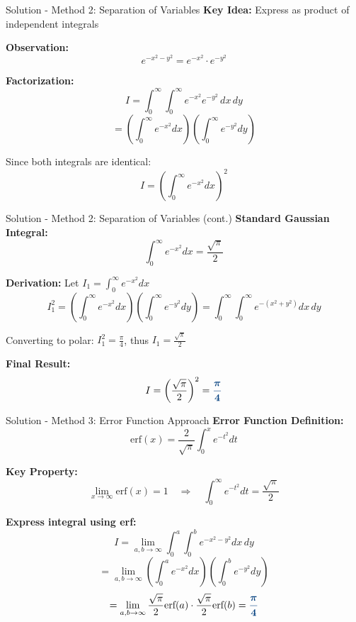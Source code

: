 \documentclass[12pt, aspectratio=169]{beamer}
\newcommand{\res}[1]{\textcolor{madblue}{\bm{#1}}}
\begin{document}
\begin{frame}{Solution - Method 2: Separation of Variables}
\textbf{Key Idea:} Express as product of independent integrals

\textbf{Observation:}
\[
e^{-x^2 - y^2} = e^{-x^2} \cdot e^{-y^2}
\]

\textbf{Factorization:}
\[
I = \int_0^\infty \int_0^\infty e^{-x^2} e^{-y^2} \, dx\,dy
\]
\[
= \left(\int_0^\infty e^{-x^2} dx\right) \left(\int_0^\infty e^{-y^2} dy\right)
\]

Since both integrals are identical:
\[
I = \left(\int_0^\infty e^{-x^2} dx\right)^2
\]
\end{frame}

\begin{frame}{Solution - Method 2: Separation of Variables (cont.)}
\textbf{Standard Gaussian Integral:}
\[
\int_0^\infty e^{-x^2} dx = \frac{\sqrt{\pi}}{2}
\]

\textbf{Derivation:} Let $I_1 = \int_0^\infty e^{-x^2} dx$
\[
I_1^2 = \left(\int_0^\infty e^{-x^2} dx\right)\left(\int_0^\infty e^{-y^2} dy\right) = \int_0^\infty \int_0^\infty e^{-(x^2+y^2)} dx\,dy
\]

Converting to polar: $I_1^2 = \frac{\pi}{4}$, thus $I_1 = \frac{\sqrt{\pi}}{2}$

\vspace{0.3cm}

\textbf{Final Result:}
\[
I = \left(\frac{\sqrt{\pi}}{2}\right)^2 = \res{\frac{\pi}{4}}
\]
\end{frame}

\begin{frame}{Solution - Method 3: Error Function Approach}
\textbf{Error Function Definition:}
\[
\text{erf}(x) = \frac{2}{\sqrt{\pi}} \int_0^x e^{-t^2} dt
\]

\textbf{Key Property:}
\[
\lim_{x \to \infty} \text{erf}(x) = 1 \quad \Rightarrow \quad \int_0^\infty e^{-t^2} dt = \frac{\sqrt{\pi}}{2}
\]

\textbf{Express integral using erf:}
\[
I = \lim_{a,b \to \infty} \int_0^a \int_0^b e^{-x^2-y^2} dx\,dy
\]
\[
= \lim_{a,b \to \infty} \left(\int_0^a e^{-x^2} dx\right)\left(\int_0^b e^{-y^2} dy\right)
\]
\[
= \lim_{a,b \to \infty} \frac{\sqrt{\pi}}{2}\text{erf}(a) \cdot \frac{\sqrt{\pi}}{2}\text{erf}(b) = \res{\frac{\pi}{4}}
\]
\end{frame}
\end{document}
